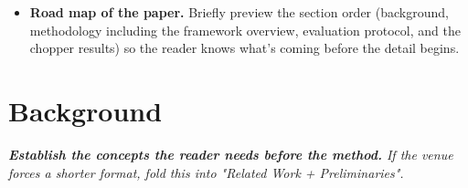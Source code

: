 \begin{itemize}
  \item \textbf{Road map of the paper.} Briefly preview the section order (background, methodology including the framework overview, evaluation protocol, and the chopper results) so the reader knows what's coming before the detail begins.


  
\end{itemize}

\section{Background}

\textit{\textbf{Establish the concepts the reader needs before the method.} If the venue forces a shorter format, fold this into "Related Work + Preliminaries".}

